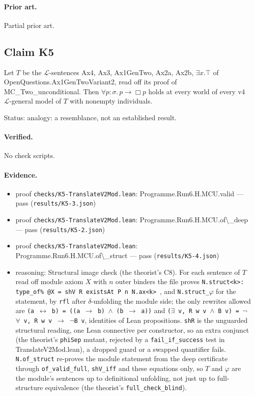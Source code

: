 \documentclass{article}
\begin{document}
\paragraph{Prior art.} Partial prior art.

\subsection*{Claim K5}

Let $T$ be the $\mathcal L$-sentences Ax4, Ax3, Ax1GenTwo, Ax2a, Ax2b, $\exists x.\top$ of OpenQuestions.Ax1GenTwoVariant2, read off its proof of MC\_Two\_unconditional. Then $\forall p{:}\sigma.\,p\to\Box p$ holds at every world of every v4 $\mathcal L$-general model of $T$ with nonempty individuals.

Status: analogy: a resemblance, not an established result.

\paragraph{Verified.}
No check scripts.

\paragraph{Evidence.}
\begin{itemize}
\item proof \texttt{checks/K5-TranslateV2Mod.lean}: Programme.Run6.H.MCU.valid --- pass (\texttt{results/K5-3.json})
\item proof \texttt{checks/K5-TranslateV2Mod.lean}: Programme.Run6.H.MCU.of\textbackslash{}\_deep --- pass (\texttt{results/K5-2.json})
\item proof \texttt{checks/K5-TranslateV2Mod.lean}: Programme.Run6.H.MCU.of\textbackslash{}\_struct --- pass (\texttt{results/K5-4.json})
\item reasoning: Structural image check (the theorist's C8). For each sentence of $T$ read off module axiom $X$ with $n$ outer binders the file proves \texttt{N.struct\textless{}k\textgreater{}: type\_of\% @X = shV R existsAt P n N.ax\textless{}k\textgreater{} }, and \texttt{N.struct\_$\varphi$} for the statement, by \texttt{rfl} after $\delta$-unfolding the module side; the only rewrites allowed are \texttt{(a $\leftrightarrow$ b) = ((a $\to$ b) $\wedge$ (b $\to$ a))} and \texttt{($\exists$ v, R w v $\wedge$ B v) = $\neg$$\forall$ v, R w v $\to$ $\neg$B v}, identities of Lean propositions. \texttt{shR} is the unguarded structural reading, one Lean connective per constructor, so an extra conjunct (the theorist's \texttt{phiSep} mutant, rejected by a \texttt{fail\_if\_success} test in TranslateV2Mod.lean), a dropped guard or a swapped quantifier fails. \texttt{N.of\_struct} re-proves the module statement from the deep certificate through \texttt{of\_valid\_full}, \texttt{shV\_iff} and these equations only, so $T$ and $\varphi$ are the module's sentences up to definitional unfolding, not just up to full-structure equivalence (the theorist's \texttt{full\_check\_blind}).
\end{itemize}
\end{document}
